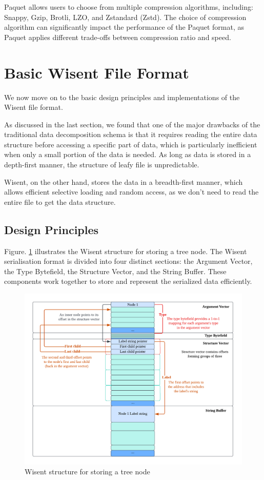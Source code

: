 Paquet allows users to choose from multiple compression algorithms, including: Snappy, Gzip, Brotli, LZO, and Zstandard (Zstd). The choice of compression algorithm can significantly impact the performance of the Paquet format, as Paquet applies different trade-offs between compression ratio and speed.


\section{Basic Wisent File Format}

We now move on to the basic design principles and implementations of the Wisent file format.

As discussed in the last section, we found that one of the major drawbacks of the traditional data decomposition schema is that it requires reading the entire data structure before accessing a specific part of data, which is particularly inefficient when only a small portion of the data is needed. As long as data is stored in a depth-first manner, the structure of leafy file is unpredictable. 

Wisent, on the other hand, stores the data in a breadth-first manner, which allows efficient selective loading and random access, as we don't need to read the entire file to get the data structure. 

\subsection{Design Principles}

Figure. \ref{fig:Wisent_structure} illustrates the Wisent structure for storing a tree node. The Wisent serialisation format is divided into four distinct sections: the Argument Vector, the Type Bytefield, the Structure Vector, and the String Buffer. These components work together to store and represent the serialized data efficiently.

\begin{center}
\begin{figure}[ht]
\centering
\includegraphics[width=\textwidth]{./Figures/WisentStructure.png}
\caption{Wisent structure for storing a tree node}
\label{fig:Wisent_structure}
\end{figure}
\end{center}

